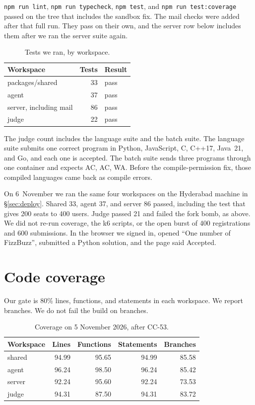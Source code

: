 \documentclass[11pt,a4paper]{article}
\begin{document}
\texttt{npm run lint}, \texttt{npm run typecheck}, \texttt{npm test}, and \texttt{npm run test:coverage} passed on the tree that includes the sandbox fix. The mail checks were added after that full run. They pass on their own, and the server row below includes them after we ran the server suite again.

\begin{table}[ht]
\centering
\caption{Tests we ran, by workspace.}
\label{tab:tests}
{\small
\begin{tabular}{@{}l r l@{}}
\toprule
Workspace & Tests & Result \\
\midrule
packages/shared & 33 & pass \\
agent & 37 & pass \\
server, including mail & 86 & pass \\
judge & 22 & pass \\
\bottomrule
\end{tabular}
}
\end{table}

The judge count includes the language suite and the batch suite. The language suite submits one correct program in Python, JavaScript, C, C++17, Java~21, and Go, and each one is accepted. The batch suite sends three programs through one container and expects AC, AC, WA. Before the compile-permission fix, those compiled languages came back as compile errors.

On 6~November we ran the same four workspaces on the Hyderabad machine in \S\ref{sec:deploy}. Shared 33, agent 37, and server 86 passed, including the test that gives 200 seats to 400 users. Judge passed 21 and failed the fork bomb, as above. We did not re-run coverage, the k6 scripts, or the open burst of 400 registrations and 600 submissions. In the browser we signed in, opened ``One number of FizzBuzz'', submitted a Python solution, and the page said Accepted.

\section{Code coverage}
\label{sec:cov}

Our gate is 80\% lines, functions, and statements in each workspace. We report branches. We do not fail the build on branches.

\begin{table}[ht]
\centering
\caption{Coverage on 5 November 2026, after CC-53.}
\label{tab:cov}
{\small
\begin{tabular}{@{}l r r r r@{}}
\toprule
Workspace & Lines & Functions & Statements & Branches \\
\midrule
shared & 94.99 & 95.65 & 94.99 & 85.58 \\
agent & 96.24 & 98.50 & 96.24 & 85.42 \\
server & 92.24 & 95.60 & 92.24 & 73.53 \\
judge & 94.31 & 87.50 & 94.31 & 83.72 \\
\bottomrule
\end{tabular}
}
\end{table}
\end{document}
